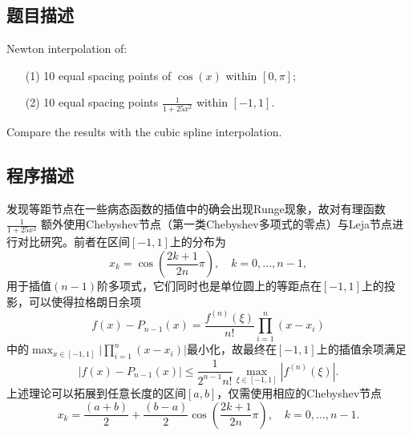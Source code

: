 \subsection{题目描述}
\label{sec:problem_1}
\noindent Newton interpolation of:
\begin{itemize}
    \item[(1)] 10 equal spacing points of \( \cos(x) \) within \( [0, \pi] \);
    \item[(2)] 10 equal spacing points \( \frac{1}{1 + 25x^2} \) within \([-1, 1]\).
\end{itemize}
Compare the results with the cubic spline interpolation.

\subsection{程序描述}
发现等距节点在一些病态函数的插值中的确会出现Runge现象，故对有理函数\( \frac{1}{1 + 25x^2} \) 额外使用Chebyshev节点（第一类Chebyshev多项式的零点）与Leja节点进行对比研究。前者在区间\([-1, 1]\)上的分布为
\[x_k=\cos{\left(\frac{2k+1}{2n}\pi\right)},\quad k=0,\ldots,n-1,\]
用于插值\((n-1)\)阶多项式，它们同时也是单位圆上的等距点在\([-1, 1]\)上的投影，可以使得拉格朗日余项
\[f(x)-P_{n-1}(x)=\frac{f^{(n)}(\xi)}{n!}\prod_{i=1}^n(x-x_i)\]
中的\(\max_{x\in[-1,1]}\Big|\prod_{i=1}^n(x-x_i)\Big|\)最小化，故最终在\([-1, 1]\)上的插值余项满足
\[|f(x)-P_{n-1}(x)|\leq\frac1{2^{n-1}n!}\max_{\xi\in[-1,1]}\left|f^{(n)}(\xi)\right|.\]上述理论可以拓展到任意长度的区间\([a,b]\)，仅需使用相应的Chebyshev节点
\[x_k=\frac{(a+b)}2+\frac{(b-a)}2\cos\left(\frac{2k+1}{2n}\pi\right),\quad k=0,\ldots,n-1.\]

